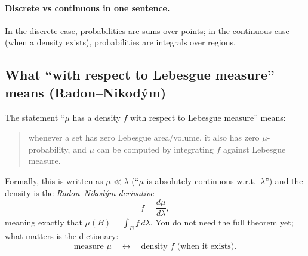 \documentclass[11pt]{article}
\theoremstyle{remark}
\begin{document}
\paragraph{Discrete vs continuous in one sentence.}
In the discrete case, probabilities are sums over points;
in the continuous case (when a density exists), probabilities are integrals over regions.

\subsection{What ``with respect to Lebesgue measure'' means (Radon--Nikod\'ym)}
The statement ``\(\mu\) has a density \(f\) with respect to Lebesgue measure'' means:
\begin{quote}
whenever a set has zero Lebesgue area/volume, it also has zero \(\mu\)-probability,
and \(\mu\) can be computed by integrating \(f\) against Lebesgue measure.
\end{quote}
Formally, this is written as \(\mu \ll \lambda\) (``\(\mu\) is absolutely continuous w.r.t.\ \(\lambda\)'')
and the density is the \emph{Radon--Nikod\'ym derivative}
\[
f=\frac{d\mu}{d\lambda},
\]
meaning exactly that \(\mu(B)=\int_B f\,d\lambda\).
You do not need the full theorem yet; what matters is the dictionary:
\[
\boxed{\text{measure } \mu \quad \longleftrightarrow\quad \text{density } f \text{ (when it exists)}.}
\]



\end{document}
